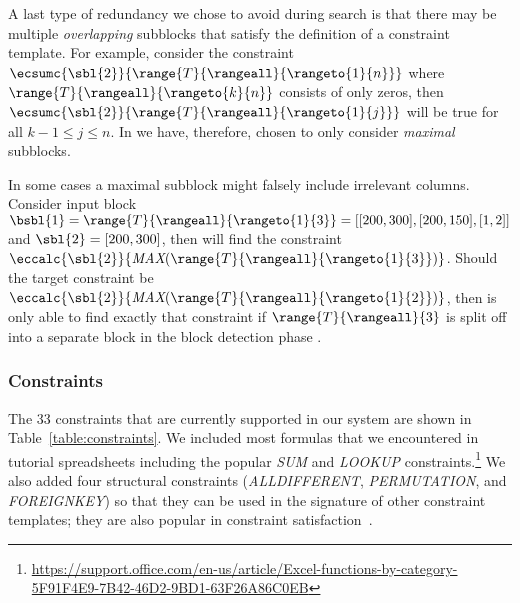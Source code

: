 A last type of redundancy we chose to avoid during search is that there may be multiple \textit{overlapping} subblocks that satisfy the definition of a constraint template.
For example, consider the constraint $\ecsumc{\sbl{2}}{\range{T}{\rangeall}{\rangeto{1}{n}}}$ where $\range{T}{\rangeall}{\rangeto{k}{n}}$ consists of only zeros, then $\ecsumc{\sbl{2}}{\range{T}{\rangeall}{\rangeto{1}{j}}}$ will be true for all $k - 1 \leq j \leq n$.
In \sname we have, therefore, chosen to only consider \textit{maximal} subblocks.

In some cases a maximal subblock might falsely include irrelevant columns.
Consider input block $\bsbl{1} = \range{T}{\rangeall}{\rangeto{1}{3}} = [[200, 300], [200, 150], [1, 2]]$ and $\sbl{2} = [200, 300]$, then \sname will find the constraint $\eccalc{\sbl{2}}{\textit{MAX}(\range{T}{\rangeall}{\rangeto{1}{3}})}$.
Should the target constraint be $\eccalc{\sbl{2}}{\textit{MAX}(\range{T}{\rangeall}{\rangeto{1}{2}})}$, then \sname is only able to find exactly that constraint if $\range{T}{\rangeall}{3}$ is split off into a separate block in the block detection phase .






\subsubsection{Constraints}
\label{sec:which_cons}
The 33 constraints that are currently supported in our system are shown in Table~\ref{table:constraints}.
We included most formulas that we encountered in tutorial spreadsheets including the popular \textit{SUM} and \textit{LOOKUP} constraints.\!\footnote{\href{https://support.office.com/en-us/article/Excel-functions-by-category-5F91F4E9-7B42-46D2-9BD1-63F26A86C0EB}{https://support.office.com/en-us/article/Excel-functions-by-category-5F91F4E9-7B42-46D2-9BD1-63F26A86C0EB}}
We also added four structural constraints (\textit{ALLDIFFERENT}, \textit{PERMUTATION}, \textit{\ecascname} and \textit{FOREIGNKEY}) so that they can be used in the signature of other constraint templates; they are also popular in constraint satisfaction~\parencite{modelseeker}.

